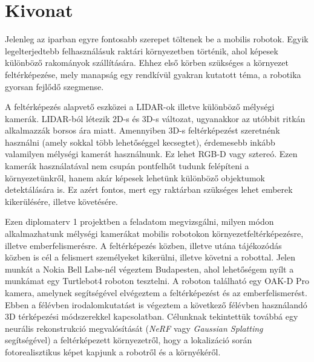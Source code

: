 \setcounter{page}{1}

\selecthungarian

\chapter*{Kivonat}

Jelenleg az iparban egyre fontosabb szerepet töltenek be a mobilis robotok. Egyik legelterjedtebb felhasználásuk raktári környezetben történik, ahol képesek különböző rakományok szállítására. Ehhez első körben szükséges a környezet feltérképezése, mely manapság egy rendkívül gyakran kutatott téma, a robotika gyorsan fejlődő szegmense.

A feltérképezés alapvető eszközei a LIDAR-ok illetve különböző mélységi kamerák. LIDAR-ból létezik 2D-s és 3D-s változat, ugyanakkor az utóbbit ritkán alkalmazzák borsos ára miatt. Amennyiben 3D-s feltérképezést szeretnénk használni (amely sokkal több lehetőséggel kecsegtet), érdemesebb inkább valamilyen mélységi kamerát használnunk. Ez lehet RGB-D vagy sztereó. Ezen kamerák használatával nem csupán pontfelhőt tudunk felépíteni a környezetünkről, hanem akár képesek lehetünk különböző objektumok detektálására is. Ez azért fontos, mert egy raktárban szükséges lehet emberek kikerülésére, illetve követésére.

Ezen diplomaterv 1 projektben a feladatom megvizsgálni, milyen módon alkalmazhatunk mélységi kamerákat mobilis robotokon környezetfeltérképezésre, illetve emberfelismerésre. A feltérképezés közben, illetve utána  tájékozódás közben is cél a felismert személyeket kikerülni, illetve követni a robottal. Jelen munkát a Nokia Bell Labs-nél végeztem Budapesten, ahol lehetőségem nyílt a munkámat egy Turtlebot4 roboton tesztelni. A roboton található egy OAK-D Pro kamera, amelynek segítségével elvégeztem a feltérképezést és az emberfelismerést. Ebben a félévben irodalomkutatást is végeztem a következő félévben használandó 3D térképezési módszerekkel kapcsolatban. Célunknak tekintettük továbbá egy neurális rekonstrukció megvalósítását (\textit{NeRF} vagy \textit{Gaussian Splatting} segítségével) a feltérképezett környezetről, hogy a lokalizáció során fotorealisztikus képet kapjunk a robotről és a környékéről.


